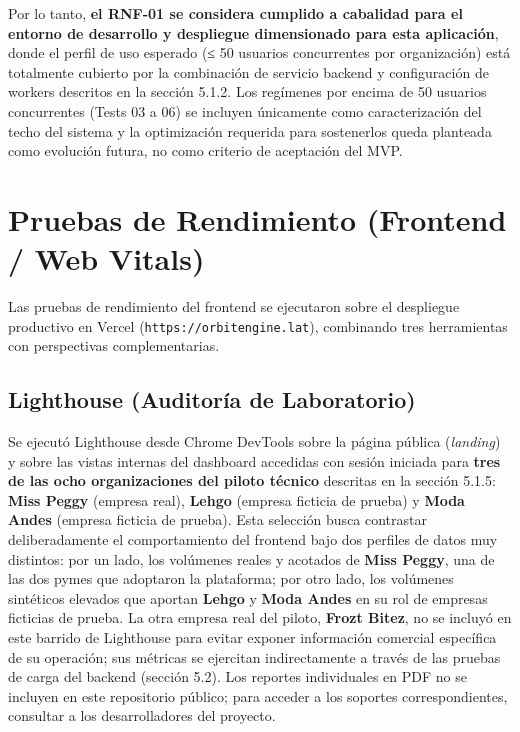 Por lo tanto, \textbf{el RNF-01 se considera cumplido a cabalidad para el entorno de desarrollo y despliegue dimensionado para esta aplicación}, donde el perfil de uso esperado (≤ 50 usuarios concurrentes por organización) está totalmente cubierto por la combinación de servicio backend y configuración de workers descritos en la sección 5.1.2. Los regímenes por encima de 50 usuarios concurrentes (Tests 03 a 06) se incluyen únicamente como caracterización del techo del sistema y la optimización requerida para sostenerlos queda planteada como evolución futura, no como criterio de aceptación del MVP.

\section{Pruebas de Rendimiento (Frontend / Web Vitals)}\label{pruebas-de-rendimiento-frontend-web-vitals}

Las pruebas de rendimiento del frontend se ejecutaron sobre el despliegue productivo en Vercel (\texttt{https://orbitengine.lat}), combinando tres herramientas con perspectivas complementarias.

\subsection{Lighthouse (Auditoría de Laboratorio)}\label{lighthouse-auditoruxeda-de-laboratorio}

Se ejecutó Lighthouse desde Chrome DevTools sobre la página pública (\emph{landing}) y sobre las vistas internas del dashboard accedidas con sesión iniciada para \textbf{tres de las ocho organizaciones del piloto técnico} descritas en la sección 5.1.5: \textbf{Miss Peggy} (empresa real), \textbf{Lehgo} (empresa ficticia de prueba) y \textbf{Moda Andes} (empresa ficticia de prueba). Esta selección busca contrastar deliberadamente el comportamiento del frontend bajo dos perfiles de datos muy distintos: por un lado, los volúmenes reales y acotados de \textbf{Miss Peggy}, una de las dos pymes que adoptaron la plataforma; por otro lado, los volúmenes sintéticos elevados que aportan \textbf{Lehgo} y \textbf{Moda Andes} en su rol de empresas ficticias de prueba. La otra empresa real del piloto, \textbf{Frozt Bitez}, no se incluyó en este barrido de Lighthouse para evitar exponer información comercial específica de su operación; sus métricas se ejercitan indirectamente a través de las pruebas de carga del backend (sección 5.2). Los reportes individuales en PDF no se incluyen en este repositorio público; para acceder a los soportes correspondientes, consultar a los desarrolladores del proyecto.



